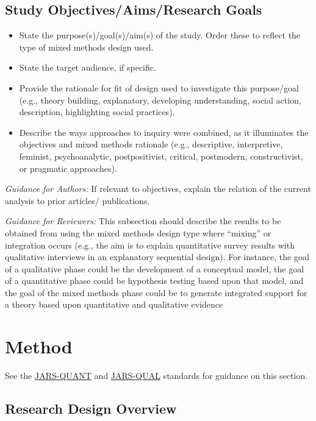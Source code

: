 \documentclass[acmsmall,screen,anonymous,review]{acmart}
\begin{document}
\subsection{Study Objectives/Aims/Research Goals}
\begin{itemize}
\item State the purpose(s)/goal(s)/aim(s) of the study. Order these to reflect the type of mixed methods design used.
\item State the target audience, if specific. 
\item Provide the rationale for fit of design used to investigate this purpose/goal (e.g., theory building, explanatory, developing understanding, social action, description, highlighting social practices).
\item Describe the ways approaches to inquiry were combined, as it illuminates the objectives and mixed methods rationale (e.g., descriptive, interpretive, feminist, psychoanalytic, postpositivist, critical, postmodern, constructivist, or pragmatic approaches).
\end{itemize}

\textit{Guidance for Authors:} If relevant to objectives, explain the relation of the current analysis to prior articles/ publications. 

\textit{Guidance for Reviewers:} This subsection should describe the results to be obtained from using the mixed methods design type where “mixing” or integration occurs (e.g., the aim is to explain quantitative survey results with qualitative interviews in an explanatory sequential design). For instance, the goal of a qualitative phase could be the development of a conceptual model, the goal of a quantitative phase could be hypothesis testing based upon that model, and the goal of the mixed methods phase could be to generate integrated support for a theory based upon quantitative and qualitative evidence

\section{Method}

See the \href{https://apastyle.apa.org/jars/quantitative}{JARS-QUANT} and \href{https://apastyle.apa.org/jars/qualitative}{JARS-QUAL} standards for guidance on this section.

\subsection{Research Design Overview}
\end{document}
